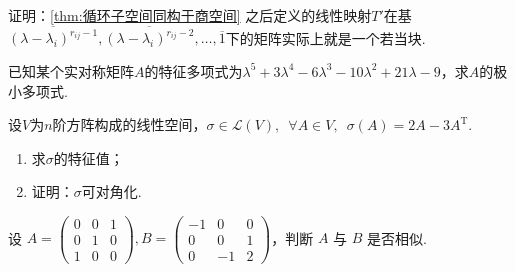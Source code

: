 \begin{exercise}

    \begin{exgroup}
        \item
    \end{exgroup}

    \begin{exgroup}
        \item 证明：\autoref{thm:循环子空间同构于商空间} 之后定义的线性映射$T'$在基$\overline{(\lambda-\lambda_i)^{r_{ij}-1}},\overline{(\lambda-\lambda_i)^{r_{ij}-2}},\ldots,\overline{1}$下的矩阵实际上就是一个若当块.
        \item 已知某个实对称矩阵$A$的特征多项式为$\lambda^5+3\lambda^4-6\lambda^3-10\lambda^2+21\lambda-9$，求$A$的极小多项式.
        \item 设$V$为$n$阶方阵构成的线性空间，$\sigma\in \mathcal{L}(V),\enspace \forall A\in V,\enspace \sigma(A)=2A-3A^{\mathrm{T}}$.
        \begin{enumerate}
            \item 求$\sigma$的特征值；
            \item 证明：$\sigma$可对角化.
        \end{enumerate}
        \item 设 $A = \begin{pmatrix}
            0 & 0 & 1 \\ 0 & 1 & 0 \\ 1 & 0 & 0
        \end{pmatrix}, B = \begin{pmatrix}
            -1 & 0 & 0 \\ 0 & 0 & 1 \\ 0 & -1 & 2
        \end{pmatrix}$，判断 $A$ 与 $B$ 是否相似.
    \end{exgroup}

    \begin{exgroup}
        \item
    \end{exgroup}
\end{exercise}
